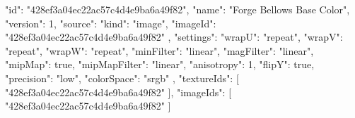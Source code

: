 {
  "id": "428ef3a04ec22ac57c4d4e9ba6a49f82",
  "name": "Forge Bellows Base Color",
  "version": 1,
  "source": {
    "kind": "image",
    "imageId": "428ef3a04ec22ac57c4d4e9ba6a49f82"
  },
  "settings": {
    "wrapU": "repeat",
    "wrapV": "repeat",
    "wrapW": "repeat",
    "minFilter": "linear",
    "magFilter": "linear",
    "mipMap": true,
    "mipMapFilter": "linear",
    "anisotropy": 1,
    "flipY": true,
    "precision": "low",
    "colorSpace": "srgb"
  },
  "textureIds": [
    "428ef3a04ec22ac57c4d4e9ba6a49f82"
  ],
  "imageIds": [
    "428ef3a04ec22ac57c4d4e9ba6a49f82"
  ]
}
